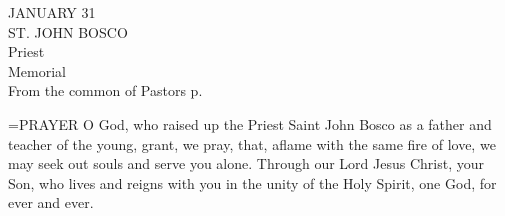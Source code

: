 \begin{center}\normalsize JANUARY 31\\
\footnotesize ST. JOHN BOSCO\\
\footnotesize Priest\\
\footnotesize Memorial\\
\footnotesize From the common of Pastors p.  \\
\end{center}

\hangindent=\parindent \small{PRAYER 
O God, who raised up the Priest Saint John Bosco
as a father and teacher of the young,
grant, we pray,
that, aflame with the same fire of love,
we may seek out souls and serve you alone.
Through our Lord Jesus Christ, your Son,
who lives and reigns with you in the unity of the Holy Spirit,
one God, for ever and ever.
 \\}
 
